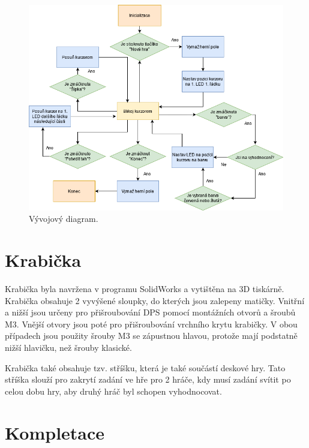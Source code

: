\begin{figure}[!h]
    \begin{center}
        \includegraphics[scale=0.45]{obrazky/vyvojovy_diagram_2_hraci.png}
    \end{center}
    \caption[Vývojový diagram]{Vývojový diagram.}
    \end{figure}

\chapter{Krabička}
Krabička byla navržena v programu SolidWorks a vytištěna na 3D tiskárně. Krabička obsahuje 2 vyvýšené sloupky, do kterých jsou zalepeny 
matičky. Vnitřní a nižší jsou určeny pro přišroubování DPS pomocí montážních otvorů a šroubů M3. Vnější otvory jsou poté pro přišroubování 
vrchního krytu krabičky. V obou případech jsou použity šrouby M3 se zápustnou hlavou, protože mají podstatně nižší hlavičku, než šrouby klasické.

Krabička také obsahuje tzv. stříšku, která je také součástí deskové hry. Tato stříška slouží pro zakrytí zadání ve hře pro 2 hráče, kdy 
musí zadání svítit po celou dobu hry, aby druhý hráč byl schopen vyhodnocovat. 

\chapter{Kompletace}